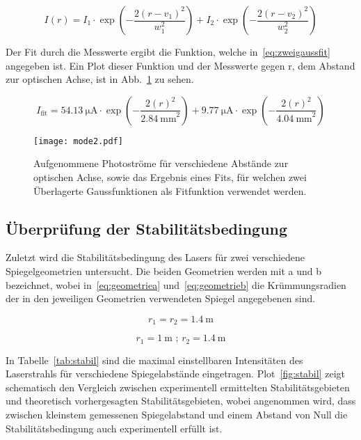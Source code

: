 \begin{equation}
I(r) = I_1 \cdot \exp{\left(-\frac{2(r-v_1)^2}{w_1^2}\right)}+
         I_2 \cdot \exp{\left(-\frac{2(r-v_2)^2}{w_2^2}\right)}
\label{eq:zweigauss}
\end{equation}
%

Der Fit durch die Messwerte ergibt die Funktion, welche 
in~\eqref{eq:zweigaussfit} angegeben ist. Ein Plot dieser 
Funktion und der Messwerte gegen r, dem Abstand zur 
optischen Achse, ist in Abb.~\ref{fig:mode2} zu sehen.

\begin{equation}
I_\text{fit} = 
\SI{54.13}{\micro\ampere}\cdot 
\exp{\left(-\frac{2(r)^2}{\SI{2.84}{\milli\metre}^2}\right)}+
\SI{9.77}{\micro\ampere}\cdot 
\exp{\left(-\frac{2(r)^2}{\SI{4.04}{\milli\metre}^2}\right)}
\label{eq:zweigaussfit}
\end{equation}

%
\begin{figure}
\centering
  \texttt{[image: mode2.pdf]}
  \caption{Aufgenommene Photoströme für verschiedene Abstände 
zur optischen Achse, sowie das Ergebnis eines Fits, für welchen 
zwei Überlagerte Gaussfunktionen als Fitfunktion verwendet werden.}
\label{fig:mode2}
\end{figure}
%

\FloatBarrier

\subsection{Überprüfung der Stabilitätsbedingung}
%
Zuletzt wird die Stabilitätsbedingung des Lasers für 
zwei verschiedene Spiegelgeometrien untersucht.
Die beiden Geometrien werden mit a und b bezeichnet, 
wobei in~\eqref{eq:geometriea} 
und~\eqref{eq:geometrieb} die Krümmungsradien der 
in den jeweiligen Geometrien verwendeten Spiegel 
angegebenen sind.

\begin{equation}
r_1 = r_2 = \SI{1.4}{\metre}
\label{eq:geometriea}
\end{equation} 

\begin{equation}
r_1 = \SI{1}{\metre}\text{ ; }r_2=\SI{1.4}{\metre}
\label{eq:geometrieb}
\end{equation}

In Tabelle~\ref{tab:stabil} sind die maximal einstellbaren 
Intensitäten des Laserstrahls für verschiedene Spiegelabstände 
eingetragen. Plot~\ref{fig:stabil} zeigt schematisch den 
Vergleich zwischen experimentell ermittelten Stabilitätsgebieten 
und theoretisch vorhergesagten Stabilitätsgebieten, wobei 
angenommen wird, dass zwischen kleinstem gemessenen 
Spiegelabstand und einem Abstand von Null die 
Stabilitätsbedingung auch experimentell erfüllt ist.

